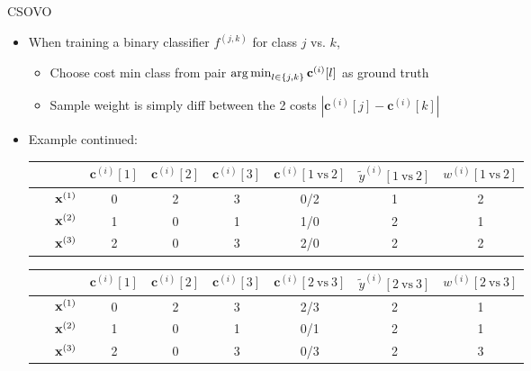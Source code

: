 \documentclass[11pt,compress,t,notes=noshow, xcolor=table]{beamer}
\newcommand{\cv}{\mathbf{c}}    %
\begin{document}
\begin{vbframe}{CSOVO}
    \begin{itemize}
        \item When training a binary classifier $f^{(j, k)}$ for class $j$ vs. $k$,
        \begin{itemize}
            \item Choose cost min class from pair $\argmin_{l \in \{j, k\}} \cv^{(i)}[l]$ as ground truth 
            \vspace{5pt}
            
            \item Sample weight is simply diff between the 2 costs      $|\cv^{(i)}[j] - \cv^{(i)}[k]|$
            \vspace{5pt}

            \vspace{5pt}
        \end{itemize}
        
        \item Example continued:
\begin{center}
    \footnotesize
                            \begin{tabular}{cc|ccc|ccc}\
        			& & $\cv^{(i)}[1]$ & $\cv^{(i)}[2]$ & $\cv^{(i)}[3]$ & $\cv^{(i)}[1 \ \text{vs} \ 2]$ & $\tilde{y}^{( i)}[1 \ \text{vs} \ 2]$ & $w^{(i)}[1 \ \text{vs} \ 2]$\\
        			\hline & $\mathbf{x}^{(1)}$ & 0 & 2 & 3 & 0/2 & 1 & 2\\
        			& $\mathbf{x}^{(2)}$ & 1 & 0 & 1 & 1/0 & 2 & 1 \\
                 	& $\mathbf{x}^{(3)}$ & 2 & 0 & 3 & 2/0 & 2 & 2\\
                \end{tabular}

            \vspace{5pt}
                            \begin{tabular}{cc|ccc|ccc}\
        			& & $\cv^{(i)}[1]$ & $\cv^{(i)}[2]$ & $\cv^{(i)}[3]$ & $\cv^{(i)}[2 \ \text{vs} \ 3]$ & $\tilde{y}^{( i)}[2 \ \text{vs} \ 3]$ & $w^{(i)}[2 \ \text{vs} \ 3]$\\
        			\hline & $\mathbf{x}^{(1)}$ & 0 & 2 & 3 & 2/3 & 2 & 1\\
        			& $\mathbf{x}^{(2)}$ & 1 & 0 & 1 & 0/1 & 2 & 1\\
                 	& $\mathbf{x}^{(3)}$ & 2 & 0 & 3 & 0/3 & 2 & 3\\
                \end{tabular}
\end{center}

    \end{itemize}
\end{vbframe}
\end{document}
